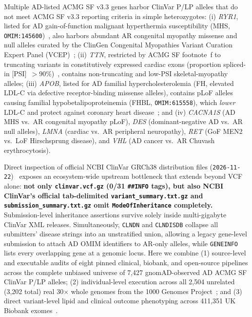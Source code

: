 \documentclass[11pt,letterpaper]{article}
\begin{document}
Multiple AD-listed ACMG SF v3.3 genes harbor ClinVar P/LP alleles that do not meet ACMG SF v3.3 reporting criteria in simple heterozygotes: (i) \textit{RYR1}, listed for AD gain-of-function malignant hyperthermia susceptibility (MHS, \texttt{OMIM:145600})~\citep{johnston2021ryr1vcep}, also harbors abundant AR congenital myopathy missense and null alleles curated by the ClinGen Congenital Myopathies Variant Curation Expert Panel (VCEP)~\citep{snoeck2015ryr1}; (ii) \textit{TTN}, restricted by ACMG SF footnote~f to truncating variants in constitutively expressed cardiac exons (proportion spliced-in [PSI]~$>90\%$)~\citep{roberts2015ttn,lee2025acmgsf33}, contains non-truncating and low-PSI skeletal-myopathy alleles; (iii) \textit{APOB}, listed for AD familial hypercholesterolemia (FH, elevated LDL-C via defective receptor-binding missense alleles), contains pLoF alleles causing familial hypobetalipoproteinemia (FHBL, \texttt{OMIM:615558}), which \emph{lower} LDL-C and protect against coronary heart disease~\citep{peloso2019apob}; and (iv) \textit{CACNA1S} (AD MHS vs.\ AR congenital myopathy pLoF), \textit{DES} (dominant-negative AD vs.\ AR null alleles), \textit{LMNA} (cardiac vs.\ AR peripheral neuropathy), \textit{RET} (GoF MEN2 vs.\ LoF Hirschsprung disease), and \textit{VHL} (AD cancer vs.\ AR Chuvash erythrocytosis).

Direct inspection of official NCBI ClinVar GRCh38 distribution files (\texttt{2026-11-22})~\citep{landrum2025clinvar} exposes an ecosystem-wide upstream bottleneck that extends beyond VCF alone: \textbf{not only \texttt{clinvar.vcf.gz} (0/31 \texttt{\#\#INFO} tags), but also NCBI ClinVar's official tab-delimited \texttt{variant\_summary.txt.gz} and \texttt{submission\_summary.txt.gz} omit \texttt{ModeOfInheritance} completely.} Submission-level inheritance assertions survive solely inside multi-gigabyte ClinVar XML releases. Simultaneously, \texttt{CLNDN} and \texttt{CLNDISDB} collapse all submitters' disease strings into an unstratified union, allowing a legacy gene-level submission to attach AD OMIM identifiers to AR-only alleles, while \texttt{GENEINFO} lists every overlapping gene at a genomic locus. Here we combine (1) source-level and executable audits of eight pinned clinical, biobank, and open-source pipelines across the complete unbiased universe of 7,427 gnomAD-observed AD ACMG SF ClinVar P/LP alleles; (2) individual-level execution across all 2,504 unrelated (3,202 total) real 30$\times$ whole genomes from the 1000 Genomes Project~\citep{byrskabishop2022_1kg}; and (3) direct variant-level lipid and clinical outcome phenotyping across 411,351 UK Biobank exomes~\citep{backman2021ukbexome,zoodsma2025nmr,buniello2025opentargets}.
\end{document}
